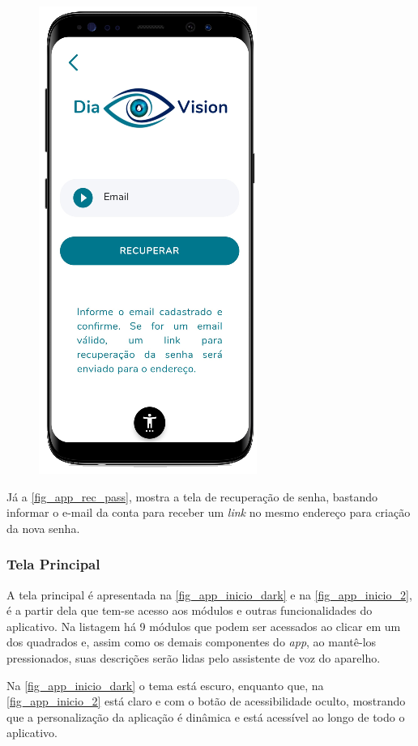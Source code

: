 \begin{figure}[htb]
\begin{minipage}{0.47\textwidth}
        \includegraphics[scale=0.72]{Imagens/desenvolvimento/app/app_rec_pass.png}
    \end{minipage}
\end{figure}

Já a \autoref{fig_app_rec_pass}, mostra a tela de recuperação de senha, bastando informar o e-mail
da conta para receber um \emph{link} no mesmo endereço para criação da nova senha.

\newpage

\subsubsection{Tela Principal}

A tela principal é apresentada na \autoref{fig_app_inicio_dark} e na \autoref{fig_app_inicio_2},
é a partir dela que tem-se acesso aos módulos e outras funcionalidades do aplicativo.
Na listagem há 9 módulos que podem ser acessados ao clicar em um dos quadrados e, assim
como os demais componentes do \emph{app}, ao mantê-los pressionados, suas descrições
serão lidas pelo assistente de voz do aparelho.

Na \autoref{fig_app_inicio_dark} o tema está escuro, enquanto que, na \autoref{fig_app_inicio_2}
está claro e com o botão de acessibilidade oculto, mostrando que a personalização da aplicação é dinâmica
e está acessível ao longo de todo o aplicativo.

